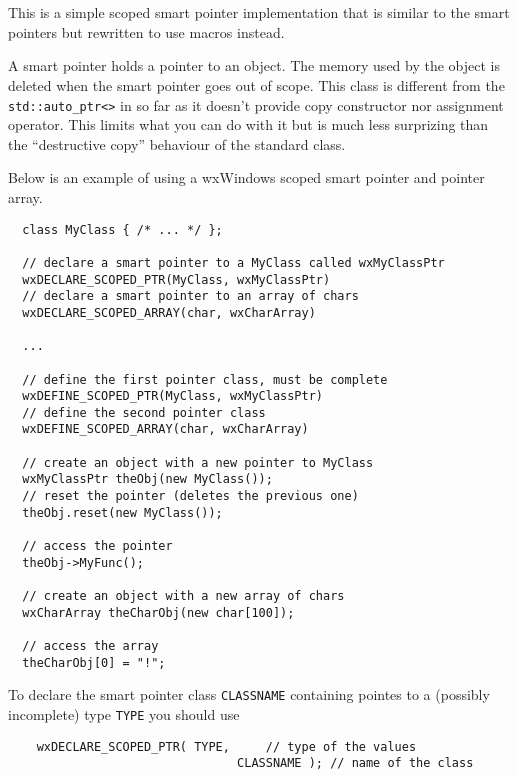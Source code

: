 {\section{}\label{wxscopedptr}

This is a simple scoped smart pointer implementation that is similar to 
the  smart pointers but rewritten to
use macros instead.

A smart pointer holds a pointer to an object. The memory used by the object is
deleted when the smart pointer goes out of scope. This class is different from
the \texttt{std::auto\_ptr<>} in so far as it doesn't provide copy constructor
nor assignment operator. This limits what you can do with it but is much less
surprizing than the ``destructive copy'' behaviour of the standard class.


Below is an example of using a wxWindows scoped smart pointer and 
pointer array.

\begin{verbatim}
  class MyClass { /* ... */ };

  // declare a smart pointer to a MyClass called wxMyClassPtr
  wxDECLARE_SCOPED_PTR(MyClass, wxMyClassPtr)
  // declare a smart pointer to an array of chars
  wxDECLARE_SCOPED_ARRAY(char, wxCharArray)

  ...

  // define the first pointer class, must be complete
  wxDEFINE_SCOPED_PTR(MyClass, wxMyClassPtr)
  // define the second pointer class
  wxDEFINE_SCOPED_ARRAY(char, wxCharArray)

  // create an object with a new pointer to MyClass
  wxMyClassPtr theObj(new MyClass());
  // reset the pointer (deletes the previous one)
  theObj.reset(new MyClass());

  // access the pointer
  theObj->MyFunc();

  // create an object with a new array of chars
  wxCharArray theCharObj(new char[100]);

  // access the array
  theCharObj[0] = "!";
\end{verbatim}


To declare the smart pointer class \texttt{CLASSNAME} containing pointes to a
(possibly incomplete) type \texttt{TYPE} you should use
\begin{verbatim}
    wxDECLARE_SCOPED_PTR( TYPE,     // type of the values
                                CLASSNAME ); // name of the class
\end{verbatim}

}
